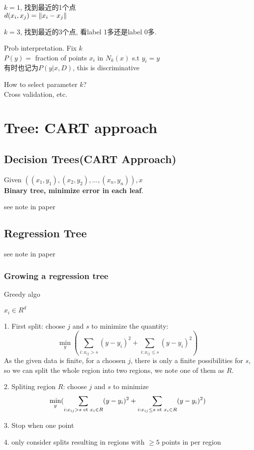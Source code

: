 \documentclass{article}
\begin{document}
$k=1$, 找到最近的1个点\\
$d(x_i, x_j) = \left\Vert x_i - x_j\right\Vert$

$k=3$, 找到最近的3个点, 看label 1多还是label 0多.

Prob interpretation. Fix $k$\\
$P(y) =$ fraction of points $x_i$ in $N_k(x)$ s.t $y_i = y$\\
有时也记为$P(y|x, D)$, this is discriminative

How to select parameter $k$?\\
Cross validation, etc.

\section{Tree: CART approach}
\subsection{Decision Trees(CART Approach)}
Given $((x_1, y_1), (x_2, y_2), \ldots, (x_n, y_n)), x$\\

\textbf{Binary tree, minimize error in each leaf}.

see note in paper

\subsection{Regression Tree}
see note in paper

\subsubsection{Growing a regression tree}
Greedy algo

$x_i \in R^d$

1. First split: choose $j$ and $s$ to minimize the quantity:
$$
\min_y (\sum_{i: x_{ij} > s} (y - y_i)^2 + \sum_{i: x_{ij} \leq s} (y - y_i)^2)
$$
As the given data is finite, for a choosen $j$, there is only a finite possibilities for $s$, \\
so we can split the whole region into two regions, we note one of them as $R$.

2. Spliting region $R$: choose $j$ and $s$ to minimize
$$
\min_y (\sum_{i: x_{ij} > s \textrm{\ et } x_i \in R} (y - y_i)^2 + \sum_{i: x_{ij} \leq s \textrm{\ et } x_i \in R} (y - y_i)^2)
$$

3. Stop when one point

4. only consider splits resulting in regions with $\geq 5$ points in per region
\end{document}
